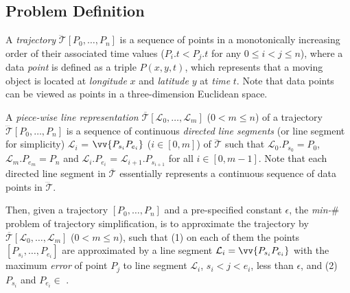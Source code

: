 \subsection{Problem Definition}
\label{subsec-notation}

A \textit{trajectory} $\dddot{\mathcal{T}}[P_0, \ldots, P_n]$ is a sequence of points in a monotonically increasing order of their associated time values (\ie $P_i.t < P_j.t$ for any $0\le i<j\le n$), where a data \textit{point} is defined as a triple $P(x, y, t)$, which represents that a moving object is located at {\em longitude} $x$ and {\em latitude} $y$ at {\em time} $t$. Note that data points can be viewed as points in a three-dimension Euclidean space.


A \textit{piece-wise line representation} $\overline{\mathcal{T}}[\mathcal{L}_0, \ldots , \mathcal{L}_m]$ ($0< m \le n$) of a trajectory $\dddot{\mathcal{T}}[P_0, \ldots, P_n]$ is a sequence of continuous \textit{directed line segments} (or line segment for simplicity) $\mathcal{L}_{i}$ = $\vv{P_{s_i}P_{e_i}}$ ($i\in[0,m]$) of $\dddot{\mathcal{T}}$ such that $\mathcal{L}_{0}.P_{s_0} = P_0$, $\mathcal{L}_{m}.P_{e_m} = P_n$ and  $\mathcal{L}_{i}.P_{e_i}$ = $\mathcal{L}_{i+1}.P_{s_{i+1}}$ for all $i\in[0, m-1]$. 
Note that each directed line segment in $\overline{\mathcal{T}}$ essentially represents a continuous sequence of data points in $\dddot{\mathcal{T}}$.


Then, given a trajectory $[P_0, \dots, P_n]$ and a pre-specified constant $\epsilon$, the \emph{min-$\#$} problem of trajectory simplification, is to approximate the trajectory  by $\overline{\mathcal{T}}[\mathcal{L}_0, \ldots , \mathcal{L}_m]$ ($0< m \le n$), such that  
(1) on each of them the points $[P_{s_i}, \dots, P_{e_i}]$ are approximated by a line segment $\mathcal{L}_i = \vv{P_{s_i}P_{e_i}}$ with the maximum \emph{error} of point $P_j$ to line segment $\mathcal{L}_i$, $s_i < j<e_i$,  less than $\epsilon$, and
(2) $P_{s_i}$ and $P_{e_i} \in$ . 

